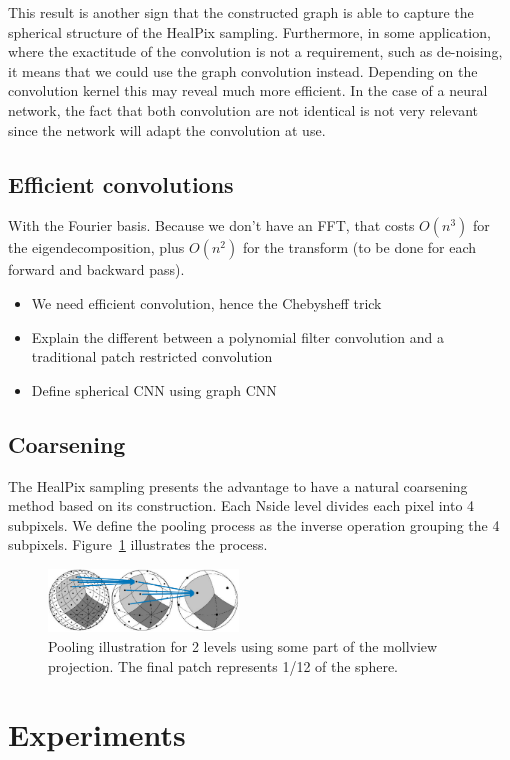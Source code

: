 \documentclass[final,twocolumn,3p,times,authoryear]{elsarticle}
\newcommand{\assign}[1]{{\color[rgb]{.8,.5,.8}{Assigned: #1 }}}
\newcommand{\1}{\b{1}}              %
\newcommand{\0}{\b{0}}              %
\begin{document}
This result is another sign that the constructed graph is able to capture the spherical
structure of the HealPix sampling. Furthermore, in some application, where the
exactitude of the convolution is not a requirement, such as de-noising, it means
that we could use the graph convolution instead. Depending on the convolution kernel
this may reveal much more efficient. In the case of a neural network, the fact
that both convolution are not identical is not very relevant since the network
will adapt the convolution at use.

\subsection{Efficient convolutions}
\assign{Michaël}
With the Fourier basis. Because we don't have an FFT, that costs $O(n^3)$ for the eigendecomposition, plus $O(n^2)$ for the transform (to be done for each forward and backward pass).
\begin{itemize}
	\item We need efficient convolution, hence the Chebysheff trick
	\item Explain the different between a polynomial filter convolution and a traditional patch restricted convolution
	\item Define spherical CNN using graph CNN
\end{itemize}


\subsection{Coarsening}
The HealPix sampling presents the advantage to have a natural coarsening method
based on its construction. Each Nside level divides each pixel into 4 subpixels.
We define the pooling process as the inverse operation grouping the 4 subpixels.
Figure~\ref{fig:pooling} illustrates the process.
\begin{figure}[!ht]
\centering
\includegraphics[width=0.45\textwidth]{figures/pooling.pdf}
\caption{Pooling illustration for 2 levels using some part of the mollview projection.
The final patch represents 1/12 of the sphere.}
\label{fig:pooling}
\end{figure}


\section{Experiments}
\label{sec:experiments}
\end{document}
